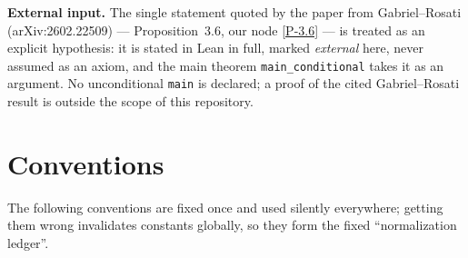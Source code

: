 \textbf{External input.} The single statement quoted by the paper from
Gabriel--Rosati (arXiv:2602.22509) --- Proposition~3.6, our node
\ref{P-3.6} --- is treated as an explicit hypothesis: it is stated in Lean
in full, marked \emph{external} here, never assumed as an axiom, and the
main theorem \texttt{main\_conditional} takes it as an argument. No
unconditional \texttt{main} is declared; a proof of the cited
Gabriel--Rosati result is outside the scope of this repository.

\section{Conventions}\label{sec:conventions}

The following conventions are fixed once and used silently everywhere;
getting them wrong invalidates constants globally, so they form the fixed
``normalization ledger''.

